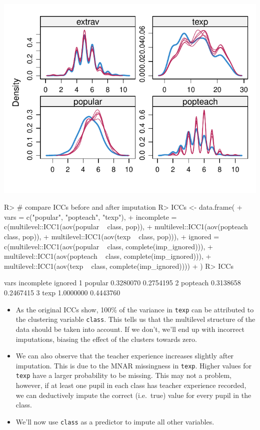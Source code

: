 \documentclass[
]{jss}
\begin{document}
\begin{CodeChunk}
\begin{center}\includegraphics{Manuscript_files/figure-latex/pop-ignored-3} \end{center}

\begin{CodeInput}
R> # compare ICCs before and after imputation
R> ICCs <- data.frame(
+   vars = c("popular", "popteach", "texp"), 
+   incomplete = c(multilevel::ICC1(aov(popular ~ class, pop)), 
+                multilevel::ICC1(aov(popteach ~ class, pop)),
+                multilevel::ICC1(aov(texp ~ class, pop))), 
+   ignored = c(multilevel::ICC1(aov(popular ~ class, complete(imp_ignored))), 
+               multilevel::ICC1(aov(popteach ~ class, complete(imp_ignored))), 
+               multilevel::ICC1(aov(texp ~ class, complete(imp_ignored))))
+   )
R> ICCs
\end{CodeInput}
\begin{CodeOutput}
      vars incomplete   ignored
1  popular  0.3280070 0.2754195
2 popteach  0.3138658 0.2467415
3     texp  1.0000000 0.4443760
\end{CodeOutput}
\end{CodeChunk}

\begin{itemize}
\item
  As the original ICCs show, 100\% of the variance in \texttt{texp} can
  be attributed to the clustering variable \texttt{class}. This tells us
  that the multilevel structure of the data should be taken into
  account. If we don't, we'll end up with incorrect imputations, biasing
  the effect of the clusters towards zero.
\item
  We can also observe that the teacher experience increases slightly
  after imputation. This is due to the MNAR missingness in
  \texttt{texp}. Higher values for \texttt{texp} have a larger
  probability to be missing. This may not a problem, however, if at
  least one pupil in each class has teacher experience recorded, we can
  deductively impute the correct (i.e.~true) value for every pupil in
  the class.
\item
  We'll now use \texttt{class} as a predictor to impute all other
  variables.
\end{itemize}
\end{document}
